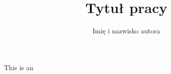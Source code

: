 \documentclass[magister,druk]{dyplom}
\author{Imię i nazwisko autora}
\title{Tytuł pracy}
\begin{document}
\maketitle



\tableofcontents






This is an



\listoffigures
\listoflistings
\listoftables

\appendixpage
\appendix

\end{document}
